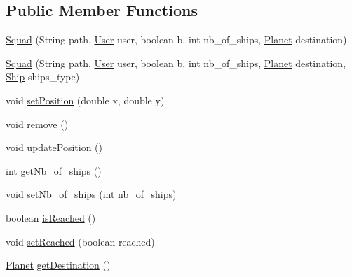 \subsection*{Public Member Functions}
\begin{DoxyCompactItemize}
\item 
\hyperlink{classfr_1_1projet_1_1groupe40_1_1model_1_1ships_1_1_squad_a5006326c653ad0f70f3092e7668d2c8d}{Squad} (String path, \hyperlink{classfr_1_1projet_1_1groupe40_1_1client_1_1_user}{User} user, boolean b, int nb\+\_\+of\+\_\+ships, \hyperlink{classfr_1_1projet_1_1groupe40_1_1model_1_1board_1_1_planet}{Planet} destination)
\item 
\hyperlink{classfr_1_1projet_1_1groupe40_1_1model_1_1ships_1_1_squad_a7221e4325db91f455b59652d047cddac}{Squad} (String path, \hyperlink{classfr_1_1projet_1_1groupe40_1_1client_1_1_user}{User} user, boolean b, int nb\+\_\+of\+\_\+ships, \hyperlink{classfr_1_1projet_1_1groupe40_1_1model_1_1board_1_1_planet}{Planet} destination, \hyperlink{classfr_1_1projet_1_1groupe40_1_1model_1_1ships_1_1_ship}{Ship} ships\+\_\+type)
\item 
void \hyperlink{classfr_1_1projet_1_1groupe40_1_1model_1_1ships_1_1_squad_ae7fb9263567ec5ad1c6a01845333b753}{set\+Position} (double x, double y)
\item 
void \hyperlink{classfr_1_1projet_1_1groupe40_1_1model_1_1ships_1_1_squad_aa3d39dd0446ca8939c385a7471b186a1}{remove} ()
\item 
void \hyperlink{classfr_1_1projet_1_1groupe40_1_1model_1_1ships_1_1_squad_a855ab9912a024f5a1bc680c8ecd061a3}{update\+Position} ()
\item 
int \hyperlink{classfr_1_1projet_1_1groupe40_1_1model_1_1ships_1_1_squad_adf99f4d47006c04a59fe76dae0abb8fa}{get\+Nb\+\_\+of\+\_\+ships} ()
\item 
void \hyperlink{classfr_1_1projet_1_1groupe40_1_1model_1_1ships_1_1_squad_aa106ce152e4f2e4e47cfea4ec49f0a7c}{set\+Nb\+\_\+of\+\_\+ships} (int nb\+\_\+of\+\_\+ships)
\item 
boolean \hyperlink{classfr_1_1projet_1_1groupe40_1_1model_1_1ships_1_1_squad_a8ca0c8e975e4218753d0cedf785c090d}{is\+Reached} ()
\item 
void \hyperlink{classfr_1_1projet_1_1groupe40_1_1model_1_1ships_1_1_squad_a2b19d260f6704c20adf55f8d9bbb8507}{set\+Reached} (boolean reached)
\item 
\hyperlink{classfr_1_1projet_1_1groupe40_1_1model_1_1board_1_1_planet}{Planet} \hyperlink{classfr_1_1projet_1_1groupe40_1_1model_1_1ships_1_1_squad_aa5362a9a9f99f3e9e43a4421bf78792c}{get\+Destination} ()

\end{DoxyCompactItemize}
